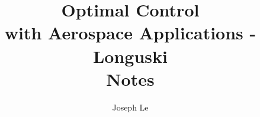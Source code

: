 \documentclass[10pt]{book}
\begin{document}
\title{Optimal Control\\ with Aerospace Applications - Longuski \\
\smallskip
\large Notes}
\author{Joseph Le}
\date{}
\maketitle
\tableofcontents





\end{document}
